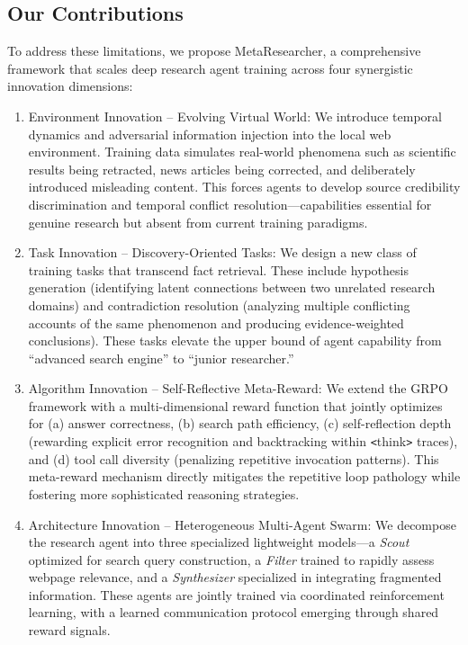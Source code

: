 \documentclass[notspecified,article,accept,pdftex,moreauthors]{Definitions/mdpi}
\renewcommand{\textbf}[1]{#1}
\begin{document}
\subsection{Our Contributions}
To address these limitations, we propose \textbf{MetaResearcher}, a comprehensive framework that scales deep research agent training across four synergistic innovation dimensions:

\begin{enumerate}
    \item \textbf{Environment Innovation -- Evolving Virtual World:} We introduce temporal dynamics and adversarial information injection into the local web environment. Training data simulates real-world phenomena such as scientific results being retracted, news articles being corrected, and deliberately introduced misleading content. This forces agents to develop source credibility discrimination and temporal conflict resolution---capabilities essential for genuine research but absent from current training paradigms.
    \item \textbf{Task Innovation -- Discovery-Oriented Tasks:} We design a new class of training tasks that transcend fact retrieval. These include hypothesis generation (identifying latent connections between two unrelated research domains) and contradiction resolution (analyzing multiple conflicting accounts of the same phenomenon and producing evidence-weighted conclusions). These tasks elevate the upper bound of agent capability from ``advanced search engine'' to ``junior researcher.''
    \item \textbf{Algorithm Innovation -- Self-Reflective Meta-Reward:} We extend the GRPO framework with a multi-dimensional reward function that jointly optimizes for (a) answer correctness, (b) search path efficiency, (c) self-reflection depth (rewarding explicit error recognition and backtracking within \texttt{<}think\texttt{>} traces), and (d) tool call diversity (penalizing repetitive invocation patterns). This meta-reward mechanism directly mitigates the repetitive loop pathology while fostering more sophisticated reasoning strategies.
    \item \textbf{Architecture Innovation -- Heterogeneous Multi-Agent Swarm:} We decompose the research agent into three specialized lightweight models---a \textit{Scout} optimized for search query construction, a \textit{Filter} trained to rapidly assess webpage relevance, and a \textit{Synthesizer} specialized in integrating fragmented information. These agents are jointly trained via coordinated reinforcement learning, with a learned communication protocol emerging through shared reward signals.
\end{enumerate}
\end{document}
